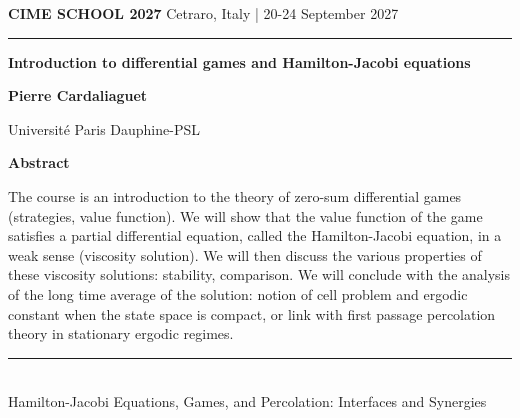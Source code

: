 \documentclass[11pt,a4paper]{article}
\begin{document}
{\small\bfseries\color{cimegold} CIME SCHOOL 2027}\hfill
{\small\color{cimeblue} Cetraro, Italy | 20-24 September 2027}

\vspace{5mm}
{\color{cimenavy}\rule{\textwidth}{1.2pt}}
\vspace{8mm}

{\fontsize{22}{27}\selectfont\bfseries\color{cimenavy}
Introduction to differential games and Hamilton-Jacobi equations\par}

\vspace{7mm}
{\large\bfseries Pierre Cardaliaguet}\par
{\color{cimeblue} Universit\'e Paris Dauphine-PSL}

\vspace{10mm}
{\large\bfseries\color{cimegold} Abstract}

The course is an introduction to the theory of zero-sum differential games (strategies, value function). We will show that the value function of the game satisfies a partial differential equation, called the Hamilton-Jacobi equation, in a weak sense (viscosity solution). We will then discuss the various properties of these viscosity solutions: stability, comparison. We will conclude with the analysis of the long time average of the solution: notion of cell problem and ergodic constant when the state space is compact, or link with first passage percolation theory in stationary ergodic regimes.

\vfill
{\color{cimenavy}\rule{\textwidth}{0.5pt}}\\[-1mm]
{\footnotesize\color{cimeblue} Hamilton-Jacobi Equations, Games, and Percolation: Interfaces and Synergies}
\end{document}
